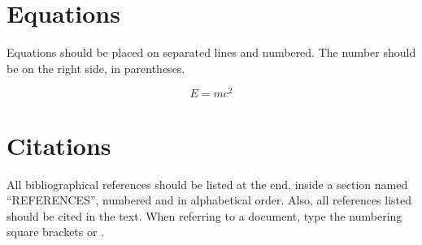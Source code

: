 \documentclass{article}
\begin{document}
\section{Equations}

Equations should be placed on separated lines and numbered. The number should be on the right side, in parentheses.

\begin{equation}
E=mc^{2}
\end{equation}

\section{Citations}

All bibliographical references should be listed at the end, inside a section named “REFERENCES”, numbered and in alphabetical order. Also, all references listed should be cited in the text. When referring to a document, type the numbering square brackets
\cite{keyRef:00} or \cite{keyRef:00, keyRef:01,keyRef:10,keyRef:11}.


\end{document}
